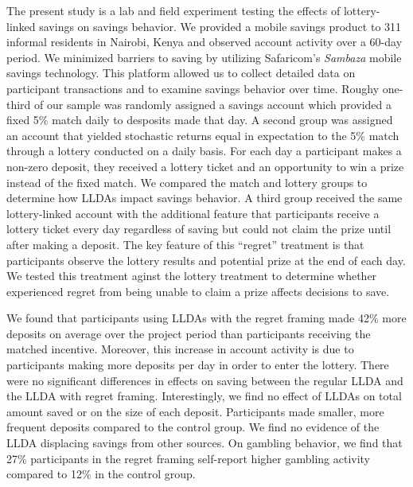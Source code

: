 \documentclass[12pt]{article}
\begin{document}
	The present study is a lab and field experiment testing the effects of lottery-linked savings on savings behavior. We provided a mobile savings product to 311 informal residents in Nairobi, Kenya and observed account activity over a 60-day period. We minimized barriers to saving by utilizing Safaricom's \textit{Sambaza} mobile savings technology. This platform allowed us to collect detailed data on participant transactions and to examine savings behavior over time. Roughy one-third of our sample was randomly assigned a savings account which provided a fixed 5\% match daily to desposits made that day. A second group was assigned an account that yielded stochastic returns equal in expectation to the 5\% match through a lottery conducted on a daily basis. For each day a participant makes a non-zero deposit, they received a lottery ticket and an opportunity to win a prize instead of the fixed match. We compared the match and lottery groups to determine how LLDAs impact savings behavior. A third group received the same lottery-linked account with the additional feature that participants receive a lottery ticket every day regardless of saving but could not claim the prize until after making a deposit. The key feature of this ``regret'' treatment is that participants observe the lottery results and potential prize at the end of each day. We tested this treatment aginst the lottery treatment to determine whether experienced regret from being unable to claim a prize affects decisions to save.


	We found that participants using LLDAs with the regret framing made 42\% more deposits on average over the project period than participants receiving the matched incentive. Moreover, this increase in account activity is due to participants making more deposits per day in order to enter the lottery. There were no significant differences in effects on saving between the regular LLDA and the LLDA with regret framing. Interestingly, we find no effect of LLDAs on total amount saved or on the size of each deposit. Participants made smaller, more frequent deposits compared to the control group. We find no evidence of the LLDA displacing savings from other sources. On gambling behavior, we find that 27\% participants in the regret framing self-report higher gambling activity compared to 12\% in the control group.
\end{document}
